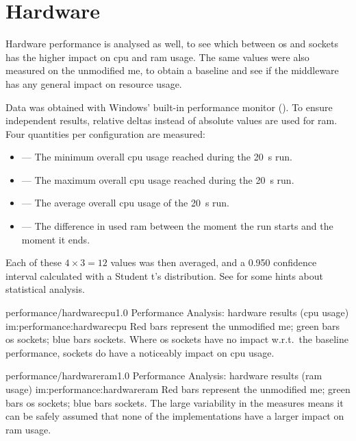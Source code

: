 \section{Hardware}\label{sc:performance:hardware}



Hardware performance is analysed as well, to see which between \gls{os} and  sockets has the higher impact on \gls{cpu} and \gls{ram} usage. The same values were also measured on the unmodified \gls{me}, to obtain a baseline and see if the \gls{middleware} has any general impact on resource usage.

Data was obtained with Windows' built-in performance monitor (). To ensure independent results, relative deltas instead of absolute values are used for \gls{ram}. Four quantities per configuration are measured:

\begin{itemize}
	\item {} --- The minimum overall \gls{cpu} usage reached during the \SI{20}{\second} run.
	\item {} --- The maximum overall \gls{cpu} usage reached during the \SI{20}{\second} run.
	\item {} --- The average overall \gls{cpu} usage of the \SI{20}{\second} run.
	\item {} --- The difference in used \gls{ram} between the moment the run starts and the moment it ends.
\end{itemize}

\FLOATnoindent Each of these $4\times3=12$ values was then averaged, and a \num{0,950} confidence interval calculated with a Student t's distribution. See  for some hints about statistical analysis.

\begin{image}
	{performance/hardwarecpu}{1.0}
	{Performance Analysis: hardware results (\gls{cpu} usage)}
	{im:performance:hardwarecpu}
	{}
	{Red bars represent the unmodified \gls{me}; green bars \gls{os} sockets; blue bars  sockets. Where \gls{os} sockets have no impact w.r.t.\ the baseline performance,  sockets do have a noticeably impact on \gls{cpu} usage.}
\end{image}

\begin{image}
	{performance/hardwareram}{1.0}
	{Performance Analysis: hardware results (\gls{ram} usage)}
	{im:performance:hardwareram}
	{}
	{Red bars represent the unmodified \gls{me}; green bars \gls{os} sockets; blue bars  sockets. The large variability in the measures means it can be safely assumed that none of the implementations have a larger impact on \gls{ram} usage.}
\end{image}

